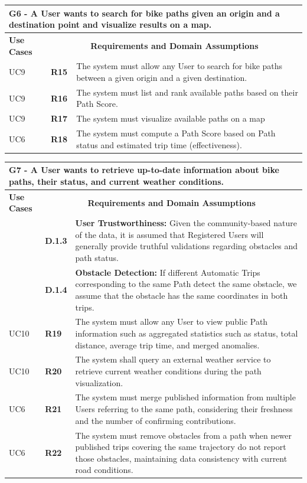 \vspace{0.5cm}

\begin{longtable}{|p{2.5cm}|p{1cm}|p{10.5cm}|}
\hline
\multicolumn{3}{|p{14.5cm}|}{\centering \textbf{G6 - A User wants to search for bike paths given an origin and a destination point and visualize results on a map.}} \\
\hline
\textbf{Use Cases} & \multicolumn{2}{c|}{\textbf{Requirements and Domain Assumptions}} \\
\hline
UC9 & \textbf{R15} & The system must allow any User to search for bike paths between a given origin and a given destination. \\
\hline
UC9 & \textbf{R16} & The system must list and rank available paths based on their Path Score. \\
\hline
UC9 & \textbf{R17} & The system must visualize available paths on a map \\
\hline
UC6 & \textbf{R18} & The system must compute a Path Score based on Path status and estimated trip time (effectiveness). \\
\hline
\end{longtable}

\vspace{0.5cm}

\begin{longtable}{|p{2.5cm}|p{1cm}|p{10.5cm}|}
\hline
\multicolumn{3}{|p{14.5cm}|}{\centering \textbf{G7 - A User wants to retrieve up-to-date information about bike paths, their status, and current weather conditions.}} \\
\hline
\textbf{Use Cases} & \multicolumn{2}{c|}{\textbf{Requirements and Domain Assumptions}} \\
& \textbf{D.1.3} & \textbf{User Trustworthiness:} Given the community-based nature of the data,
it is assumed that Registered Users will generally provide truthful validations regarding obstacles and path status. \\
\hline
& \textbf{D.1.4} & \textbf{Obstacle Detection:} If different Automatic Trips corresponding to the same Path detect the same obstacle, we assume that the obstacle has the same
coordinates in both trips. \\
\hline
UC10 & \textbf{R19} & The system must allow any User to view public Path information such as aggregated statistics such as status, total distance, average trip time, and merged anomalies. \\
\hline
UC10 & \textbf{R20} & The system shall query an external weather service to retrieve current weather conditions during the path visualization. \\
\hline
UC6 & \textbf{R21} & The system must merge published information from multiple Users referring to the same path, considering their freshness and the number of confirming contributions. \\
\hline
UC6 & \textbf{R22} & The system must remove obstacles from a path when newer published trips covering the same trajectory do not report those obstacles, maintaining data consistency with current road conditions. \\
\hline
\hline
\end{longtable}

